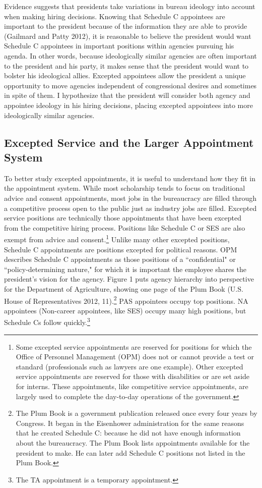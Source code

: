 \documentclass[12pt]{article}
\begin{document}
Evidence suggests that presidents take variations in bureau ideology into account when making hiring decisions. Knowing that Schedule C appointees are important to the president because of the information they are able to provide (Gailmard and Patty 2012), it is reasonable to believe the president would want Schedule C appointees in important positions within agencies pursuing his agenda. In other words, because ideologically similar agencies are often important to the president and his party, it makes sense that the president would want to bolster his ideological allies. Excepted appointees allow the president a unique opportunity to move agencies independent of congressional desires and sometimes in spite of them. I hypothesize that the president will consider both agency and appointee ideology in his hiring decisions, placing excepted appointees into more ideologically similar agencies.

\subsection*{Excepted Service and the Larger Appointment System}

	To better study excepted appointments, it is useful to understand how they fit in the appointment system. While most scholarship tends to focus on traditional advice and consent appointments, most jobs in the bureaucracy are filled through a competitive process open to the public just as industry jobs are filled. Excepted service positions are technically those appointments that have been excepted from the competitive hiring process. Positions like Schedule C or SES are also exempt from advice and consent.\footnote{Some excepted service appointments are reserved for positions for which the Office of Personnel Management (OPM) does not or cannot provide a test or standard (professionals such as lawyers are one example). Other excepted service appointments are reserved for those with disabilities or are set aside for interns. These appointments, like competitive service appointments, are largely used to complete the day-to-day operations of the government.}	Unlike many other excepted positions, Schedule C appointments are positions excepted for political reasons. OPM describes Schedule C appointments as those positions of a ``confidential" or ``policy-determining nature," for which it is important the employee shares the president's vision for the agency. Figure 1 puts agency hierarchy into perspective for the Department of Agriculture, showing one page of the Plum Book (U.S. House of Representatives 2012, 11).\footnote{The Plum Book is a government publication released once every four years by Congress. It began in the Eisenhower administration for the same reasons that he created Schedule C: because he did not have enough information about the bureaucracy. The Plum Book lists appointments available for the president to make. He can later add Schedule C positions not listed in the Plum Book.} PAS appointees occupy top positions. NA appointees (Non-career appointees, like SES) occupy many high positions, but Schedule Cs follow quickly.\footnote{The TA appointment is a temporary appointment.}
	
\end{document}
